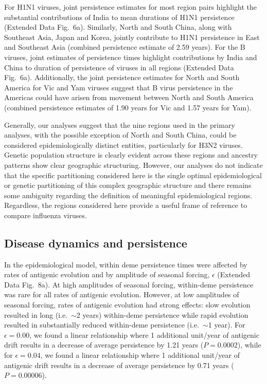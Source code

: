 \documentclass[11pt,oneside,letterpaper]{article}
\begin{document}
For H1N1 viruses, joint persistence estimates for most region pairs highlight the substantial contributions of India to mean durations of H1N1 persistence (Extended Data Fig.~6a).
Similarly, North and South China, along with Southeast Asia, Japan and Korea, jointly contribute to H1N1 persistence in East and Southeast Asia (combined persistence estimate of 2.59 years).
For the B viruses, joint estimates of persistence times highlight contributions by India and China to duration of persistence of viruses in all regions (Extended Data Fig.~6a).
Additionally, the joint persistence estimates for North and South America for Vic and Yam viruses suggest that B virus persistence in the Americas could have arisen from movement between North and South America (combined persistence estimates of 1.90 years for Vic and 1.57 years for Yam).

Generally, our analyses suggest that the nine regions used in the primary analyses, with the possible exception of North and South China, could be considered epidemiologically distinct entities, particularly for H3N2 viruses.
Genetic population structure is clearly evident across these regions and ancestry patterns show clear geographic structuring.
However, our analyses do not indicate that the specific partitioning considered here is the single optimal epidemiological or genetic partitioning of this complex geographic structure and there remains some ambiguity regarding the definition of meaningful epidemiological regions.  
Regardless, the regions considered here provide a useful frame of reference to compare influenza viruses.

\subsection*{Disease dynamics and persistence}

In the epidemiological model, within deme persistence times were affected by rates of antigenic evolution and by amplitude of seasonal forcing, $\epsilon$ (Extended Data Fig.~8a).
At high amplitudes of seasonal forcing, within-deme persistence was rare for all rates of antigenic evolution.
However, at low amplitudes of seasonal forcing, rates of antigenic evolution had strong effects: slow evolution resulted in long (i.e.\ $\sim$2 years) within-deme persistence while rapid evolution resulted in substantially reduced within-deme persistence (i.e.\ $\sim$1 year).
For $\epsilon = 0.00$, we found a linear relationship where 1 additional unit/year of antigenic drift results in a decrease of average persistence by 1.21 years ($P = 0.0002$), while for $\epsilon = 0.04$, we found a linear relationship where 1 additional unit/year of antigenic drift results in a decrease of average persistence by 0.71 years ($P = 0.00006$).
\end{document}
